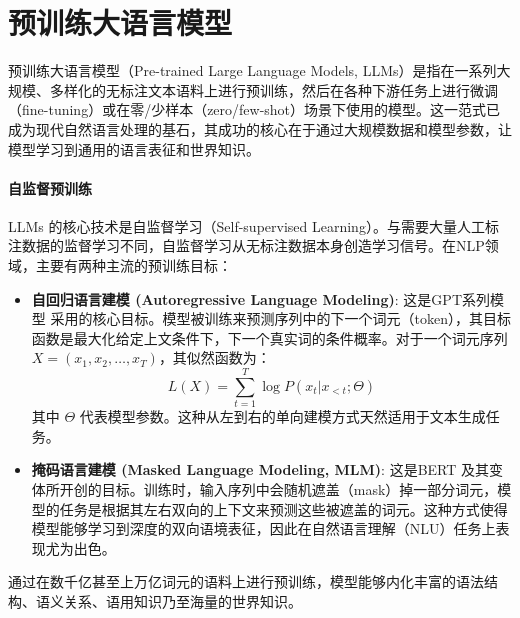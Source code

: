 \section{预训练大语言模型}

预训练大语言模型（Pre-trained Large Language Models, LLMs）是指在一系列大规模、多样化的无标注文本语料上进行预训练，然后在各种下游任务上进行微调（fine-tuning）或在零/少样本（zero/few-shot）场景下使用的模型。这一范式已成为现代自然语言处理的基石，其成功的核心在于通过大规模数据和模型参数，让模型学习到通用的语言表征和世界知识。

\paragraph{自监督预训练}
LLMs 的核心技术是自监督学习（Self-supervised Learning）。与需要大量人工标注数据的监督学习不同，自监督学习从无标注数据本身创造学习信号。在NLP领域，主要有两种主流的预训练目标：
\begin{itemize}
    \item \textbf{自回归语言建模 (Autoregressive Language Modeling)}: 这是GPT系列模型 \cite{Radford2018ImprovingLU} 采用的核心目标。模型被训练来预测序列中的下一个词元（token），其目标函数是最大化给定上文条件下，下一个真实词的条件概率。对于一个词元序列 $X = (x_1, x_2, \dots, x_T)$，其似然函数为：
    \begin{equation}
    L(X) = \sum_{t=1}^{T} \log P(x_t | x_{<t}; \Theta)
    \end{equation}
    其中 $\Theta$ 代表模型参数。这种从左到右的单向建模方式天然适用于文本生成任务。

    \item \textbf{掩码语言建模 (Masked Language Modeling, MLM)}: 这是BERT \cite{Devlin2019BERTPO} 及其变体所开创的目标。训练时，输入序列中会随机遮盖（mask）掉一部分词元，模型的任务是根据其左右双向的上下文来预测这些被遮盖的词元。这种方式使得模型能够学习到深度的双向语境表征，因此在自然语言理解（NLU）任务上表现尤为出色。
\end{itemize}
通过在数千亿甚至上万亿词元的语料上进行预训练，模型能够内化丰富的语法结构、语义关系、语用知识乃至海量的世界知识。

